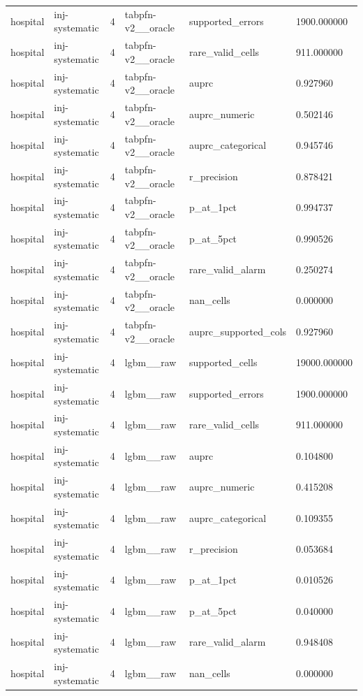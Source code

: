 \begin{tabular}{llllll}
hospital & inj-systematic & 4 & tabpfn-v2\_\_oracle & supported\_errors & 1900.000000 \\
hospital & inj-systematic & 4 & tabpfn-v2\_\_oracle & rare\_valid\_cells & 911.000000 \\
hospital & inj-systematic & 4 & tabpfn-v2\_\_oracle & auprc & 0.927960 \\
hospital & inj-systematic & 4 & tabpfn-v2\_\_oracle & auprc\_numeric & 0.502146 \\
hospital & inj-systematic & 4 & tabpfn-v2\_\_oracle & auprc\_categorical & 0.945746 \\
hospital & inj-systematic & 4 & tabpfn-v2\_\_oracle & r\_precision & 0.878421 \\
hospital & inj-systematic & 4 & tabpfn-v2\_\_oracle & p\_at\_1pct & 0.994737 \\
hospital & inj-systematic & 4 & tabpfn-v2\_\_oracle & p\_at\_5pct & 0.990526 \\
hospital & inj-systematic & 4 & tabpfn-v2\_\_oracle & rare\_valid\_alarm & 0.250274 \\
hospital & inj-systematic & 4 & tabpfn-v2\_\_oracle & nan\_cells & 0.000000 \\
hospital & inj-systematic & 4 & tabpfn-v2\_\_oracle & auprc\_supported\_cols & 0.927960 \\
hospital & inj-systematic & 4 & lgbm\_\_raw & supported\_cells & 19000.000000 \\
hospital & inj-systematic & 4 & lgbm\_\_raw & supported\_errors & 1900.000000 \\
hospital & inj-systematic & 4 & lgbm\_\_raw & rare\_valid\_cells & 911.000000 \\
hospital & inj-systematic & 4 & lgbm\_\_raw & auprc & 0.104800 \\
hospital & inj-systematic & 4 & lgbm\_\_raw & auprc\_numeric & 0.415208 \\
hospital & inj-systematic & 4 & lgbm\_\_raw & auprc\_categorical & 0.109355 \\
hospital & inj-systematic & 4 & lgbm\_\_raw & r\_precision & 0.053684 \\
hospital & inj-systematic & 4 & lgbm\_\_raw & p\_at\_1pct & 0.010526 \\
hospital & inj-systematic & 4 & lgbm\_\_raw & p\_at\_5pct & 0.040000 \\
hospital & inj-systematic & 4 & lgbm\_\_raw & rare\_valid\_alarm & 0.948408 \\
hospital & inj-systematic & 4 & lgbm\_\_raw & nan\_cells & 0.000000 \\

\end{tabular}
